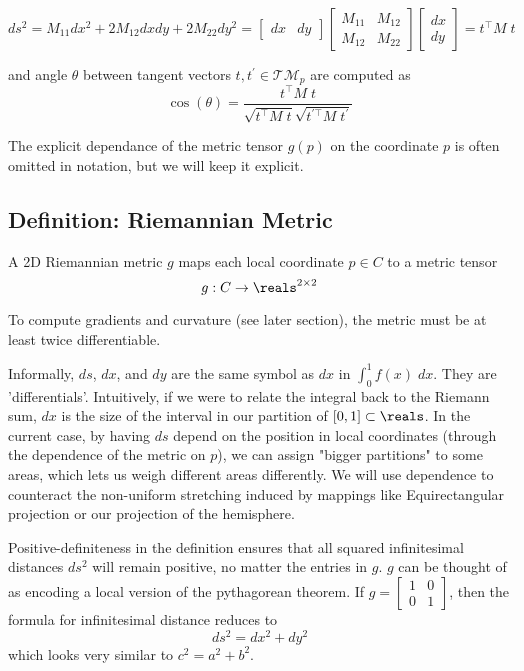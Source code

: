 $$ds^2 = M_{11}dx^2 + 2M_{12}dxdy + 2M_{22}dy^2 = \begin{bmatrix} dx & dy\end{bmatrix} \begin{bmatrix} M_{11} & M_{12} \\ M_{12} & M_{22}\end{bmatrix} \begin{bmatrix} dx \\ dy\end{bmatrix} = t^\top M\; t $$

and angle $\theta$ between tangent vectors $t, t^\prime \in \mathcal{TM}_p$ are computed as $$\cos(\theta) = \frac{t^\top M \; t}{\sqrt{t^\top M \; t}\sqrt{t^{\prime \top} M \; t^\prime}}$$



The explicit dependance of the metric tensor $g(p)$ on the coordinate $p$ is often omitted in notation, but we will keep it explicit. 

\subsection{ Definition: Riemannian Metric}

A 2D Riemannian metric $g$ maps each local coordinate $p\in C$ to a metric tensor 
$$g: C\to \reals^{2\times 2}$$



To compute gradients and curvature (see later section), the metric must be at least twice differentiable.

Informally, $ds$, $dx$, and $dy$ are the same symbol as $dx$ in $\int_0^1 f(x) \;dx$. They are 'differentials'. Intuitively, if we were to relate the integral back to the Riemann sum, $dx$ is the size of the interval in our partition of $[0, 1] \subset \reals$. In the current case, by having $ds$ depend on the position in local coordinates (through the dependence of the metric on $p$), we can assign "bigger partitions" to some areas, which lets us weigh different areas differently. We will use dependence to counteract the non-uniform stretching induced by mappings like Equirectangular projection or our projection of the hemisphere.

Positive-definiteness in the definition ensures that all squared infinitesimal distances $ds^2$ will remain positive, no matter the entries in $g$. $g$ can be thought of as encoding a local version of the pythagorean theorem. If $g = \begin{bmatrix} 1 & 0 \\ 0 & 1\end{bmatrix}$, then the formula for infinitesimal distance reduces to $$ds^2 = dx^2 + dy^2$$ which looks very similar to $c^2 = a^2 + b^2$. 



